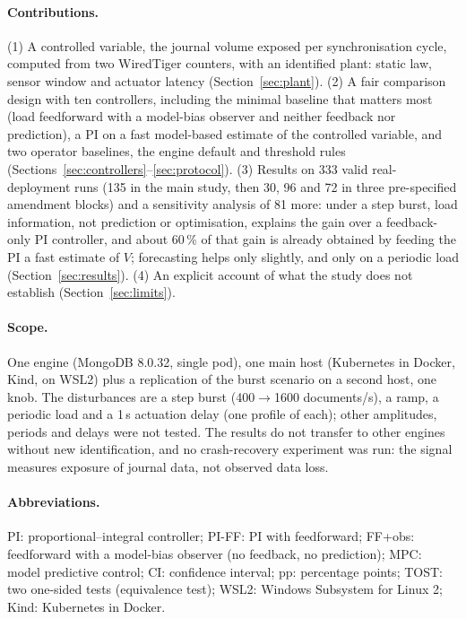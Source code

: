 \documentclass[smallextended]{svjour3}
\begin{document}
\paragraph{Contributions.}
(1) A controlled variable, the journal volume exposed per synchronisation cycle,
computed from two WiredTiger counters, with an identified plant: static law,
sensor window and actuator latency (Section~\ref{sec:plant}).
(2) A fair comparison design with ten controllers, including the minimal
baseline that matters most (load feedforward with a model-bias observer and neither
feedback nor prediction), a PI on a fast model-based estimate of the controlled variable, and two operator baselines, the engine default and threshold rules (Sections~\ref{sec:controllers}--\ref{sec:protocol}).
(3) Results on 333 valid real-deployment runs (135 in the main study, then 30, 96 and 72 in three pre-specified amendment blocks) and a sensitivity analysis of 81 more: under a step burst, load information, not prediction or
optimisation, explains the gain over a feedback-only PI controller, and about 60\,\% of that gain is already obtained by feeding the PI a fast estimate of $V$; forecasting helps only slightly, and only on a periodic load
(Section~\ref{sec:results}).
(4) An explicit account of what the study does not establish
(Section~\ref{sec:limits}).

\paragraph{Scope.}
One engine (MongoDB 8.0.32, single pod), one main host (Kubernetes in Docker, Kind, on WSL2) plus a replication of the burst scenario on a second host, one knob. The
disturbances are a step burst (400$\to$1600 documents/s), a ramp, a periodic load and a 1\,s actuation delay (one profile of each); other amplitudes, periods and delays were not tested. The
results do not transfer to other engines without new identification, and no
crash-recovery experiment was run: the signal measures exposure of journal
data, not observed data loss.

\paragraph{Abbreviations.}
PI: proportional--integral controller; PI-FF: PI with feedforward; FF+obs: feedforward with a model-bias observer (no feedback, no prediction); MPC: model predictive control;
CI: confidence interval; pp: percentage points; TOST: two one-sided tests (equivalence test); WSL2: Windows Subsystem for Linux 2; Kind: Kubernetes in Docker.
\end{document}
